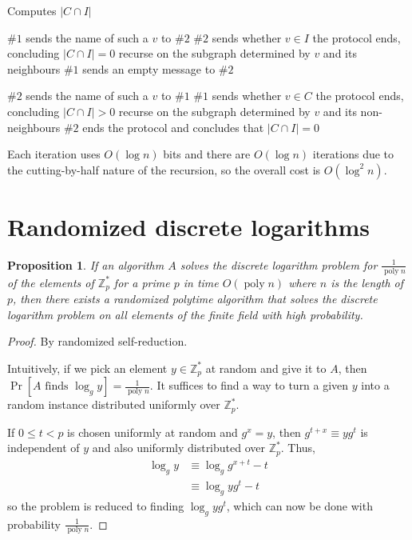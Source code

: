 \documentclass[letterpaper,11pt]{article}
\newtheorem{prop}{Proposition}
\DeclareMathOperator{\PrOp}{Pr}
\DeclareMathOperator{\poly}{poly}
\renewcommand{\Pr}[1]{\PrOp{\left[\text{#1}\right]}}
\newcommand{\Z}{\mathbb{Z}}
\begin{document}
\begin{algorithm}
    \caption{Computes $|C \cap I|$}
    \begin{algorithmic}
            \State $\#1$ sends the name of such a $v$ to $\#2$
            \State $\#2$ sends whether $v \in I$
                \State the protocol ends, concluding $|C \cap I| = 0$
            \Else
                \State recurse on the subgraph determined by $v$ and its
                neighbours
            \EndIf
        \Else
            \State $\#1$ sends an empty message to $\#2$
        \EndIf

            \State $\#2$ sends the name of such a $v$ to $\#1$
            \State $\#1$ sends whether $v \in C$
                \State the protocol ends, concluding $|C \cap I| > 0$
            \Else
                \State recurse on the subgraph determined by $v$ and its
                non-neighbours
            \EndIf
        \Else
            \State $\#2$ ends the protocol and concludes that $|C \cap I| = 0$
        \EndIf
    \end{algorithmic}
    \label{alg:clique-indep}
\end{algorithm}

Each iteration uses $O(\log n)$ bits and there are $O(\log n)$ iterations due
to the cutting-by-half nature of the recursion, so the overall cost is
$O(\log^2 n)$.

\section{Randomized discrete logarithms}

\begin{prop}
    If an algorithm $A$ solves the discrete logarithm problem for
    $\frac{1}{\poly{n}}$ of the elements of $\Z_p^*$ for a prime $p$ in time
    $O(\poly n)$ where $n$ is the length of $p$, then there exists a randomized
    polytime algorithm that solves the discrete logarithm problem on all
    elements of the finite field with high probability.
\end{prop}

\begin{proof} By randomized self-reduction.

    Intuitively, if we pick an element $y \in \Z_p^*$ at random and give it to
    $A$, then $\Pr{$A$ finds $\log_g y$} = \frac{1}{\poly n}$. It
    suffices to find a way to turn a given $y$ into a random instance
    distributed uniformly over $\Z_p^*$.

    If $0 \leq t < p$ is chosen uniformly at random and $g^x = y$, then
    $g^{t+x} \equiv yg^t$ is independent of $y$ and also uniformly distributed
    over $\Z_p^*$. Thus,
    \begin{align*}
        \log_g y
            &\equiv \log_g{g^{x+t}} - t \\
            &\equiv \log_g{yg^t} - t
    \end{align*}
    so the problem is reduced to finding $\log_g{yg^t}$, which can now be done
    with probability $\frac{1}{\poly n}$.
\end{proof}
\end{document}
